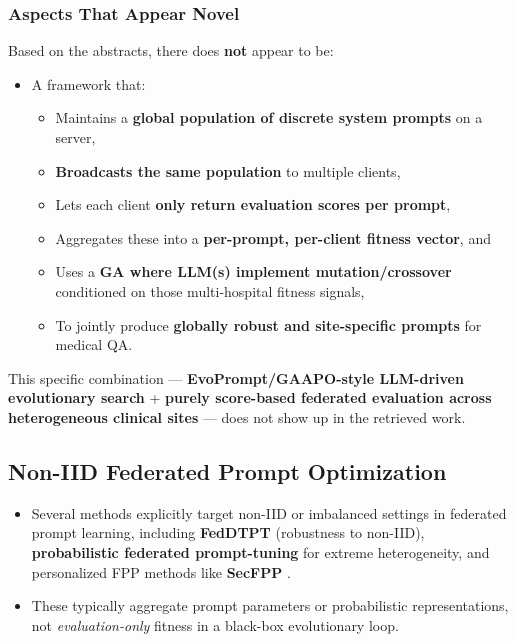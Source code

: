 \subsubsection*{\textbf{Aspects That Appear Novel}}


Based on the abstracts, there does \textbf{not} appear to be:


\begin{itemize}
\item A framework that:\begin{itemize}
\item Maintains a \textbf{global population of discrete system prompts} on a server,
\item \textbf{Broadcasts the same population} to multiple clients,
\item Lets each client \textbf{only return evaluation scores per prompt},
\item Aggregates these into a \textbf{per-prompt, per-client fitness vector}, and
\item Uses a \textbf{GA where LLM(s) implement mutation/crossover} conditioned on those multi-hospital fitness signals,
\item To jointly produce \textbf{globally robust and site-specific prompts} for medical QA.
\end{itemize}


\end{itemize}


This specific combination — \textbf{EvoPrompt/GAAPO-style LLM-driven evolutionary search} + \textbf{purely score-based federated evaluation across heterogeneous clinical sites} — does not show up in the retrieved work.


\subsection*{Non-IID Federated Prompt Optimization}


\begin{itemize}
\item Several methods explicitly target non-IID or imbalanced settings in federated prompt learning, including \textbf{FedDTPT} (robustness to non-IID), \textbf{probabilistic federated prompt-tuning} for extreme heterogeneity, and personalized FPP methods like \textbf{SecFPP}  \cite{Wu2024FedDTPT:} \cite{Singhal2025Toward} \cite{Abdolmaleki2025Sync-GWO:}.
\item These typically aggregate prompt parameters or probabilistic representations, not \textit{evaluation-only} fitness in a black-box evolutionary loop.
\end{itemize}


